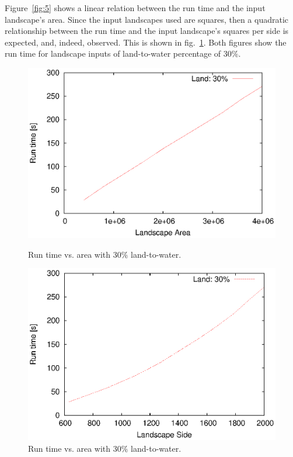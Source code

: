 \documentclass[12pt,a4paper]{article}
\begin{document}
Figure~\ref{fig:5} shows a linear relation between the run time and the input 
landscape's area. Since the input landscapes used are squares, then a quadratic 
relationship between the run time and the input landscape's 
squares per side is expected, and, indeed, observed. This is shown in 
fig.~\ref{fig:6}. Both figures show the run 
time for landscape inputs of land-to-water percentage of $30\%$.

\begin{figure}[ht]
\begin{minipage}[b]{0.475\linewidth}
\centering
\includegraphics[width=\textwidth]{img/map_size_area_30.eps}
\caption{Run time vs. area with $30\%$ land-to-water.}
\label{fig:5}
\end{minipage}
\hspace{0.5cm}
\begin{minipage}[b]{0.475\linewidth}
\centering
\includegraphics[width=\textwidth]{img/map_size_side_30.eps}
\caption{Run time vs. area with $30\%$ land-to-water.}
\label{fig:6}
\end{minipage}
\end{figure}
\end{document}
